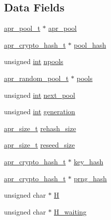 \subsection*{Data Fields}
\begin{DoxyCompactItemize}
\item 
\hyperlink{structapr__pool__t}{apr\+\_\+pool\+\_\+t} $\ast$ \hyperlink{structapr__random__t_a688ac9ee770bd6a93502bbc9b0f6d6fd}{apr\+\_\+pool}
\item 
\hyperlink{structapr__crypto__hash__t}{apr\+\_\+crypto\+\_\+hash\+\_\+t} $\ast$ \hyperlink{structapr__random__t_a51927e9e35790ec6388d92a528162581}{pool\+\_\+hash}
\item 
unsigned \hyperlink{pcre_8txt_a42dfa4ff673c82d8efe7144098fbc198}{int} \hyperlink{structapr__random__t_a19fca442fbc0f3f25b14ea5d2b005a3f}{npools}
\item 
\hyperlink{structapr__random__pool__t}{apr\+\_\+random\+\_\+pool\+\_\+t} $\ast$ \hyperlink{structapr__random__t_a4cc993b0e187c7197cd0201bbe297a66}{pools}
\item 
unsigned \hyperlink{pcre_8txt_a42dfa4ff673c82d8efe7144098fbc198}{int} \hyperlink{structapr__random__t_a859d3646820c5ea997e76eca0aab4c28}{next\+\_\+pool}
\item 
unsigned \hyperlink{pcre_8txt_a42dfa4ff673c82d8efe7144098fbc198}{int} \hyperlink{structapr__random__t_a1dcfffb1bdc4635d653b0c695816be22}{generation}
\item 
\hyperlink{group__apr__platform_gaaa72b2253f6f3032cefea5712a27540e}{apr\+\_\+size\+\_\+t} \hyperlink{structapr__random__t_a31b0c6f16645d75f5c20d3aeffbe7131}{rehash\+\_\+size}
\item 
\hyperlink{group__apr__platform_gaaa72b2253f6f3032cefea5712a27540e}{apr\+\_\+size\+\_\+t} \hyperlink{structapr__random__t_a20e8fe5449e31fc9cbb3accad34fd17a}{reseed\+\_\+size}
\item 
\hyperlink{structapr__crypto__hash__t}{apr\+\_\+crypto\+\_\+hash\+\_\+t} $\ast$ \hyperlink{structapr__random__t_aa8a3d2b35dcea37f67f94f2758d84053}{key\+\_\+hash}
\item 
\hyperlink{structapr__crypto__hash__t}{apr\+\_\+crypto\+\_\+hash\+\_\+t} $\ast$ \hyperlink{structapr__random__t_a24c8179e80f667444d750054acfe866e}{prng\+\_\+hash}
\item 
unsigned char $\ast$ \hyperlink{structapr__random__t_a27213433192f280fd8c54174f0d791b9}{H}
\item 
unsigned char $\ast$ \hyperlink{structapr__random__t_a26826fba24c34278692d315f2ed32aa5}{H\+\_\+waiting}
\item 

\end{DoxyCompactItemize}
